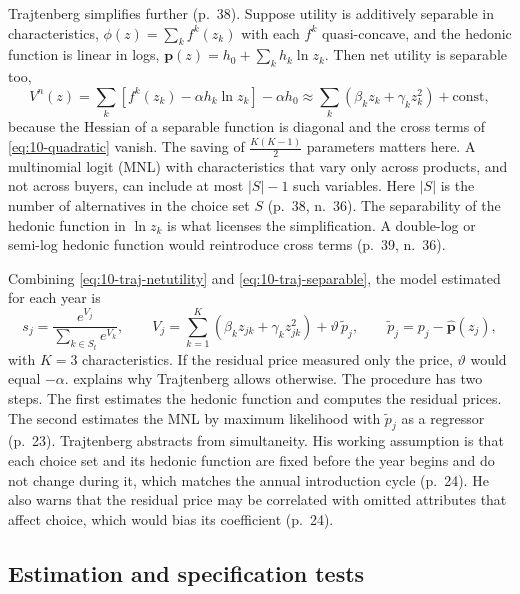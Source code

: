  Trajtenberg simplifies further (p.~38). Suppose utility is additively
separable in characteristics, $\phi(z) = \sum_k f^k(z_k)$ with each $f^k$ quasi-concave, and the hedonic function
is linear in logs, $\mathbf{p}(z) = h_0 + \sum_k h_k\ln z_k$. Then net utility is separable too,
\begin{equation}\label{eq:10-traj-separable}
V^n(z) = \sum_k\left[f^k(z_k) - \alpha h_k\ln z_k\right] - \alpha h_0
\approx \sum_k\left(\beta_kz_k + \gamma_kz_k^2\right) + \text{const},
\end{equation}
because the Hessian of a separable function is diagonal and the cross terms of \eqref{eq:10-quadratic} vanish. The
saving of $\frac{K(K-1)}{2}$ parameters matters here. A multinomial logit (MNL) with characteristics that vary only
across products, and not across buyers, can include at most $|S| - 1$ such variables. Here $|S|$ is the number of
alternatives in the choice set $S$ (p.~38, n.~36). The separability of the hedonic function in $\ln z_k$ is what licenses the simplification. A double-log or
semi-log hedonic function would reintroduce cross terms (p.~39, n.~36).

 Combining \eqref{eq:10-traj-netutility} and \eqref{eq:10-traj-separable}, the
model estimated for each year is
\begin{equation}\label{eq:10-traj-estimating}
s_j = \frac{e^{V_j}}{\sum_{k\in S_t}e^{V_k}},
\qquad
V_j = \sum_{k=1}^{K}\left(\beta_kz_{jk} + \gamma_kz_{jk}^2\right) + \vartheta\,\tilde p_j,
\qquad
\tilde p_j = p_j - \hat{\mathbf{p}}(z_j),
\end{equation}
with $K = 3$ characteristics. If the residual price measured only the price, $\vartheta$ would equal $-\alpha$.
 explains why Trajtenberg allows otherwise. The procedure has two steps. The first estimates
the hedonic function and computes the residual prices. The second estimates the MNL by maximum likelihood with
$\tilde p_j$ as a regressor (p.~23). Trajtenberg abstracts from simultaneity. His working assumption is that each
choice set and its hedonic function are fixed before the year begins and do not change during it, which matches
the annual introduction cycle (p.~24). He also warns that the residual price may be correlated with omitted
attributes that affect choice, which would bias its coefficient (p.~24).

\subsection{Estimation and specification tests}\label{sec:10-ct-estimation}

